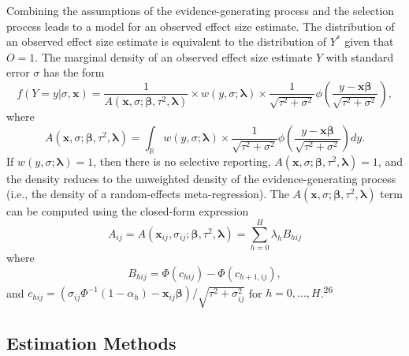 \documentclass[
  american,
  man, donotrepeattitle,floatsintext]{apa7}
\begin{document}
Combining the assumptions of the evidence-generating process and the selection process leads to a model for an observed effect size estimate. The distribution of an observed effect size estimate is equivalent to the distribution of \(Y^*\) given that \(O = 1\).
The marginal density of an observed effect size estimate \(Y\) with standard error \(\sigma\) has the form
\begin{equation}
\label{eq:generic-selection}
f(Y = y | \sigma, \mathbf{x}) = \frac{1}{A(\mathbf{x}, \sigma; \boldsymbol\beta, \tau^2, \boldsymbol\lambda)} \times w\left(y, \sigma; \boldsymbol\lambda \right) \times \frac{1}{\sqrt{\tau^2 + \sigma^2}} \phi\left(\frac{y - \mathbf{x} \boldsymbol\beta}{\sqrt{\tau^2 + \sigma^2}}\right),
\end{equation}
where
\begin{equation}
\label{eq:generic-selection-A}
A(\mathbf{x}, \sigma; \boldsymbol\beta, \tau^2, \boldsymbol\lambda) =  \int_\mathbb{R} w\left(y, \sigma; \boldsymbol\lambda \right) \times  \frac{1}{\sqrt{\tau^2 + \sigma^2}}\phi\left(\frac{y - \mathbf{x}\boldsymbol\beta}{\sqrt{\tau^2 + \sigma^2}}\right) dy.
\end{equation}
If \(w(y, \sigma; \boldsymbol\lambda) = 1\), then there is no selective reporting, \(A(\mathbf{x}, \sigma; \boldsymbol\beta, \tau^2, \boldsymbol\lambda) = 1\), and the density reduces to the unweighted density of the evidence-generating process (i.e., the density of a random-effects meta-regression).
The \(A(\mathbf{x}, \sigma; \boldsymbol\beta, \tau^2, \boldsymbol\lambda)\) term can be computed using the closed-form expression
\begin{equation}
\label{eq:step-function-A}
A_{ij} = A(\mathbf{x}_{ij}, \sigma_{ij}; \boldsymbol\beta, \tau^2, \boldsymbol\lambda) = \sum_{h=0}^H \lambda_h B_{hij}
\end{equation}
where
\begin{equation}
\label{eq:step-function-Bhij}
B_{hij} = \Phi\left(c_{hij}\right) - \Phi\left(c_{h+1,ij}\right),
\end{equation}
and \(c_{hij} = \left(\sigma_{ij} \Phi^{-1}\left(1 - \alpha_h\right) - \mathbf{x}_{ij}\boldsymbol\beta\right) / \sqrt{\tau^2 + \sigma_{ij}^2}\) for \(h = 0,...,H\).\textsuperscript{26}

\subsection{Estimation Methods}\label{estimation-methods}
\end{document}
